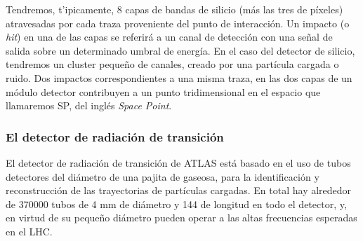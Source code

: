 
  Tendremos, t'ipicamente, 8 capas de bandas de silicio (m\'as las tres de p\'ixeles) atravesadas por cada traza proveniente del punto de interacci\'on. Un impacto (o \emph{hit}) en una de las capas se referir\'a a un canal de detecci\'on con una se\~nal de salida sobre un determinado umbral de energ\'ia. En el caso del detector de silicio, tendremos un cluster peque\~no de canales, creado por una part\'icula cargada o ruido. Dos impactos correspondientes a una misma traza, en las dos capas de un m\'odulo detector contribuyen a un punto tridimensional en el espacio que llamaremos SP, del ingl\'es \emph{Space Point}. 


\subsubsection{El detector de radiaci\'on de transici\'on}

 
  El detector de radiaci\'on de transici\'on de ATLAS est\'a basado en el uso de tubos detectores del di\'ametro de una pajita de gaseosa, para la identificaci\'on y reconstrucci\'on de las trayectorias de part\'iculas cargadas. En total hay alrededor de 370000 tubos de 4 mm de di\'ametro y 144 de longitud en todo el detector, y, en virtud de su peque\~no di\'ametro pueden operar a las altas frecuencias esperadas en el LHC. %
   
